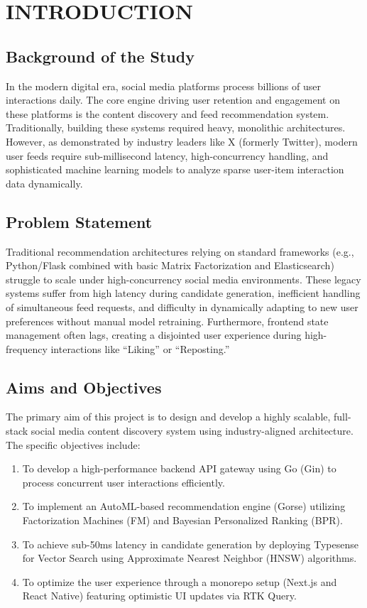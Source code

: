 \chapter{INTRODUCTION}
\clearpage

\section{Background of the Study}
In the modern digital era, social media platforms process billions of user interactions daily. The core engine driving user retention and engagement on these platforms is the content discovery and feed recommendation system. Traditionally, building these systems required heavy, monolithic architectures. However, as demonstrated by industry leaders like X (formerly Twitter), modern user feeds require sub-millisecond latency, high-concurrency handling, and sophisticated machine learning models to analyze sparse user-item interaction data dynamically.

\section{Problem Statement}
Traditional recommendation architectures relying on standard frameworks (e.g., Python/Flask combined with basic Matrix Factorization and Elasticsearch) struggle to scale under high-concurrency social media environments. These legacy systems suffer from high latency during candidate generation, inefficient handling of simultaneous feed requests, and difficulty in dynamically adapting to new user preferences without manual model retraining. Furthermore, frontend state management often lags, creating a disjointed user experience during high-frequency interactions like ``Liking'' or ``Reposting.''

\section{Aims and Objectives}
The primary aim of this project is to design and develop a highly scalable, full-stack social media content discovery system using industry-aligned architecture. The specific objectives include:
\begin{enumerate}
    \item To develop a high-performance backend API gateway using Go (Gin) to process concurrent user interactions efficiently.
    \item To implement an AutoML-based recommendation engine (Gorse) utilizing Factorization Machines (FM) and Bayesian Personalized Ranking (BPR).
    \item To achieve sub-50ms latency in candidate generation by deploying Typesense for Vector Search using Approximate Nearest Neighbor (HNSW) algorithms.
    \item To optimize the user experience through a monorepo setup (Next.js and React Native) featuring optimistic UI updates via RTK Query.
\end{enumerate}

